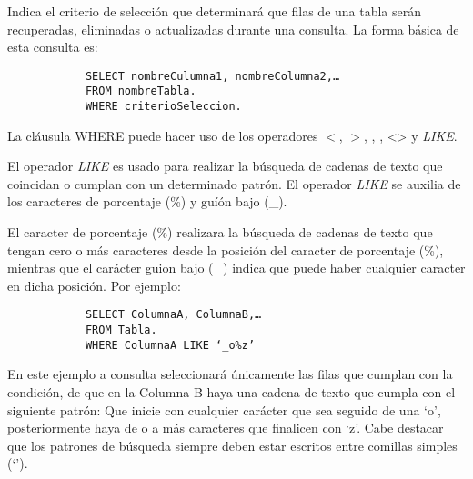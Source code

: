 \documentclass[10pt,a4paper]{article} %
\begin{document}
	\subsubsection{\color{colorESCOM}{Clausula WHERE}}
	{\large Indica el criterio de selecci{\' o}n que determinar{\' a} que filas de una tabla ser{\' a}n recuperadas, eliminadas o actualizadas durante una consulta. La forma b{\' a}sica de esta consulta es:
		
		\begin{lstlisting}
			SELECT nombreCulumna1, nombreColumna2,…
			FROM nombreTabla.
			WHERE criterioSeleccion.
		\end{lstlisting}
		
		La cl{\' a}usula WHERE puede hacer uso de los operadores $<$, $>$, \leq, \geq, <> y \textit{LIKE}. 
		
		
		\vspace{0.5cm}
		El operador \textit{LIKE} es usado para realizar la b{\' u}squeda de cadenas de texto que coincidan o cumplan con un determinado patr{\' o}n. El operador \textit{LIKE} se auxilia de los caracteres de porcentaje (\%) y gu{\' i}{\' o}n bajo (\_).
		
		
		\vspace{0.5cm}
		El caracter de porcentaje (\%) realizara la b{\' u}squeda de cadenas de texto que tengan cero o m{\' a}s caracteres desde la posici{\' o}n del caracter de porcentaje (\%), mientras que el car{\' a}cter guion bajo (\_) indica que puede haber cualquier caracter en dicha posici{\' o}n. Por ejemplo:
		
		\begin{lstlisting}
			SELECT ColumnaA, ColumnaB,…
			FROM Tabla.
			WHERE ColumnaA LIKE ‘_o%z’
		\end{lstlisting}
		
		En este ejemplo a consulta seleccionar{\' a} {\' u}nicamente las filas que cumplan con la condici{\' o}n, de que en la Columna B haya una cadena de texto que cumpla con el siguiente patr{\' o}n: Que inicie con cualquier car{\' a}cter que sea seguido de una `o’, posteriormente haya de o a m{\' a}s caracteres que finalicen con `z’. Cabe destacar que los patrones de b{\' u}squeda siempre deben estar escritos entre comillas simples (`’).
	}
	
\end{document}
